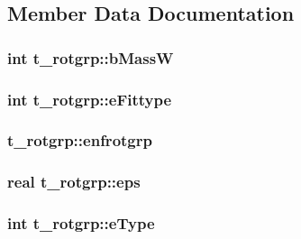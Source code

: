 \subsection{\-Member \-Data \-Documentation}
\hypertarget{structt__rotgrp_a8e132137a1e058720468896fb7868e05}{
\subsubsection[{b\-Mass\-W}]{\setlength{\rightskip}{0pt plus 5cm}int {\bf t\-\_\-rotgrp\-::b\-Mass\-W}}}\label{structt__rotgrp_a8e132137a1e058720468896fb7868e05}
\hypertarget{structt__rotgrp_a05d694ca164761c380285e1d50f013fb}{
\subsubsection[{e\-Fittype}]{\setlength{\rightskip}{0pt plus 5cm}int {\bf t\-\_\-rotgrp\-::e\-Fittype}}}\label{structt__rotgrp_a05d694ca164761c380285e1d50f013fb}
\hypertarget{structt__rotgrp_a8cde0913b0ba9ce3b10ef705a50d9b57}{
\subsubsection[{enfrotgrp}]{ {\bf t\-\_\-rotgrp\-::enfrotgrp}}}\label{structt__rotgrp_a8cde0913b0ba9ce3b10ef705a50d9b57}
\hypertarget{structt__rotgrp_aa71fd350e0a5e364c875cfe47a17ffc2}{
\subsubsection[{eps}]{\setlength{\rightskip}{0pt plus 5cm}real {\bf t\-\_\-rotgrp\-::eps}}}\label{structt__rotgrp_aa71fd350e0a5e364c875cfe47a17ffc2}
\hypertarget{structt__rotgrp_abb65d4912b682682356e00c2dbd143bf}{
\subsubsection[{e\-Type}]{\setlength{\rightskip}{0pt plus 5cm}int {\bf t\-\_\-rotgrp\-::e\-Type}}}\label{structt__rotgrp_abb65d4912b682682356e00c2dbd143bf}
